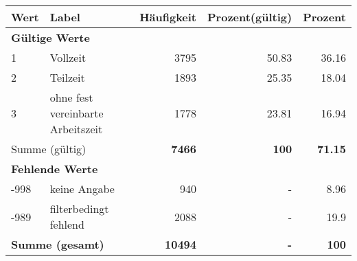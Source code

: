      \begin{longtable}{lXrrr}
     \toprule
     \textbf{Wert} & \textbf{Label} & \textbf{Häufigkeit} & \textbf{Prozent(gültig)} & \textbf{Prozent} \\
     \endhead
     \midrule
     \multicolumn{5}{l}{\textbf{Gültige Werte}}\\

     1 &
     \multicolumn{1}{X}{ Vollzeit   } &


       \num{3795} &
       \num[round-mode=places,round-precision=2]{50,83} &
         \num[round-mode=places,round-precision=2]{36,16} \\

     2 &
     \multicolumn{1}{X}{ Teilzeit   } &


       \num{1893} &
       \num[round-mode=places,round-precision=2]{25,35} &
         \num[round-mode=places,round-precision=2]{18,04} \\

     3 &
     \multicolumn{1}{X}{ ohne fest vereinbarte Arbeitszeit   } &


       \num{1778} &
       \num[round-mode=places,round-precision=2]{23,81} &
         \num[round-mode=places,round-precision=2]{16,94} \\
     \midrule
     \multicolumn{2}{l}{Summe (gültig)} &
       \textbf{\num{7466}} &
     \textbf{100} &
       \textbf{\num[round-mode=places,round-precision=2]{71,15}} \\
     \multicolumn{5}{l}{\textbf{Fehlende Werte}}\\
       -998 &
       keine Angabe &
         \num{940} &
        - &
         \num[round-mode=places,round-precision=2]{8,96} \\
       -989 &
       filterbedingt fehlend &
         \num{2088} &
        - &
         \num[round-mode=places,round-precision=2]{19,9} \\
     \midrule
     \multicolumn{2}{l}{\textbf{Summe (gesamt)}} &
          \textbf{\num{10494}} &
        \textbf{-} &
        \textbf{100} \\
     \bottomrule
     \end{longtable}
     
